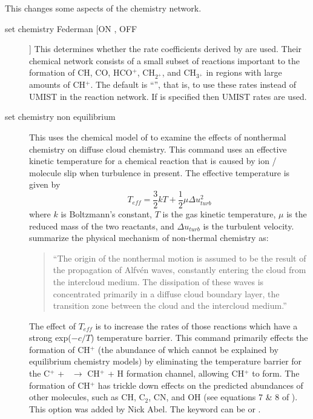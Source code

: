 This changes some aspects of the chemistry network.
\begin{description}
\item[set chemistry Federman  [ON , OFF]]  This determines whether the rate
coefficients derived by \citet{Zsargo2003} are used.
Their
chemical network consists of a small subset of reactions important to the
formation of CH, CO, HCO$^+$, CH$_{2^{+}}$, and CH$_{3{^+}}$ in regions with large amounts
of CH$^+$.
The default is ``'', that is, to use these rates instead of UMIST
in the reaction network.
If  is specified then UMIST rates are used.

\item[set chemistry non equilibrium] This uses the chemical model of \citet{Federman1996} to examine the effects of nonthermal chemistry on diffuse
cloud chemistry.
This command uses an effective kinetic temperature for
a chemical reaction that is caused by ion / molecule slip
when turbulence in present.
The effective temperature is given by
\begin{equation}
T_{eff}  = \frac{3}{2}kT + \frac{1}{2}\mu \Delta u_{turb}^2
\end{equation}
where $k$ is Boltzmann's constant, $T$ is the gas kinetic temperature, $\mu$ is
the reduced mass of the two reactants, and $\Delta u_{turb}$ is the turbulent velocity.
\citet{Zsargo2003} summarize the physical mechanism of
non-thermal chemistry as:
\begin{quote}
``The origin of the nonthermal motion is assumed to be the result of
the propagation of Alfv\'en waves, constantly entering the cloud from the
intercloud medium.
The dissipation of these waves is concentrated primarily
in a diffuse cloud boundary layer,
the transition zone between the cloud
and the intercloud medium.''
\end{quote}
   The effect of $T_{eff}$ is to increase the rates of those reactions which
have a strong exp($-c/T$) temperature barrier.
This command primarily effects
the formation of CH$^+$ (the abundance of which cannot be explained by
equilibrium chemistry models) by eliminating the temperature barrier for
the C$^+$ + \htwo\ $\to$ CH$^+$ + H formation channel, allowing CH$^+$ to form.
The formation of CH$^+$ has trickle down effects on the predicted abundances
of other molecules,
such as CH, C$_2$, CN, and OH (see equations 7 \& 8 of
\citealp{Zsargo2003}).
This option was added by Nick Abel.
The keyword can
be  or .


\end{description}
